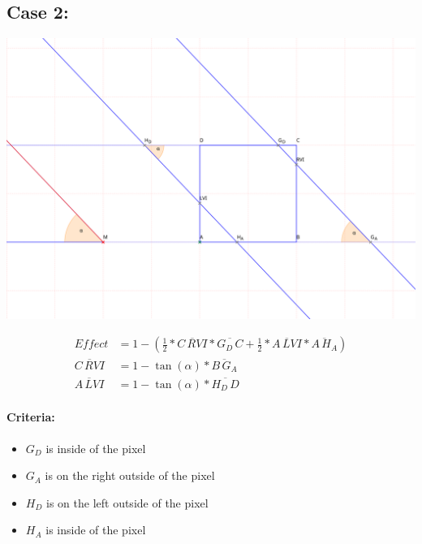 \documentclass[a4paper,10pt,fleqn]{scrartcl}
\numberwithin{equation}{subsection}
\begin{document}
\subsection{Case 2:}
\begin{minipage}{\textwidth}
\includegraphics[width=\textwidth]{case2}
\end{minipage}
\begin{align}
Effect &= 1 - (\frac{1}{2} * \overline{C\,RVI} * \overline{G_D\,C} + \frac{1}{2} * \overline{A\,LVI} * \overline{A\,H_A})\\
\overline{C\,RVI} &=  1 - \tan(\alpha) * \overline{B\,G_A}\\
\overline{A\,LVI} &=  1 - \tan(\alpha) * \overline{H_D\,D}
\end{align}
\paragraph{Criteria:}
\begin{itemize}
 \item $G_D$ is inside of the pixel
 \item $G_A$ is on the right outside of the pixel
 \item $H_D$ is on the left outside of the pixel
 \item $H_A$ is inside of the pixel
\end{itemize}
%
\end{document}
